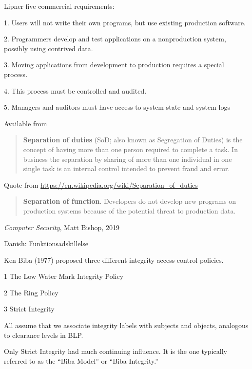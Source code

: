 \documentclass[Screen16to9,17pt]{foils}
\begin{document}

Lipner five commercial requirements:
\begin{list2}
\item[1.] Users will not write their own programs, but use existing
  production software.
\item[2.] Programmers develop and test applications on a nonproduction system, possibly using contrived data.
\item[3.] Moving applications from development to production requires a special process.
\item[4.] This process must be controlled and audited.
\item[5.] Managers and auditors must have access to system state and system logs
\end{list2}


Available from\\ {\footnotesize{}}



\begin{quote}
{\bf Separation of duties} (SoD; also known as Segregation of Duties) is the concept of having more than one person required to complete a task. In business the separation by sharing of more than one individual in one single task is an internal control intended to prevent fraud and error.
\end{quote}

Quote from \url{https://en.wikipedia.org/wiki/Separation_of_duties}

\begin{quote}
{\bf Separation of function}. Developers do not develop new programs on production systems because of the potential threat to production data.
\end{quote}
\emph{Computer Security}, Matt Bishop, 2019

Danish: Funktionsadskillelse



Ken Biba (1977) proposed three different integrity access control
policies.

\begin{list2}
\item[1] The Low Water Mark Integrity Policy
\item[2] The Ring Policy
\item[3] Strict Integrity
\item All assume that we associate integrity labels with subjects and
objects, analogous to clearance levels in BLP.
\item Only Strict Integrity had much continuing influence. It is the one
typically referred to as the “Biba Model” or “Biba Integrity.”
\end{list2}
\end{document}
